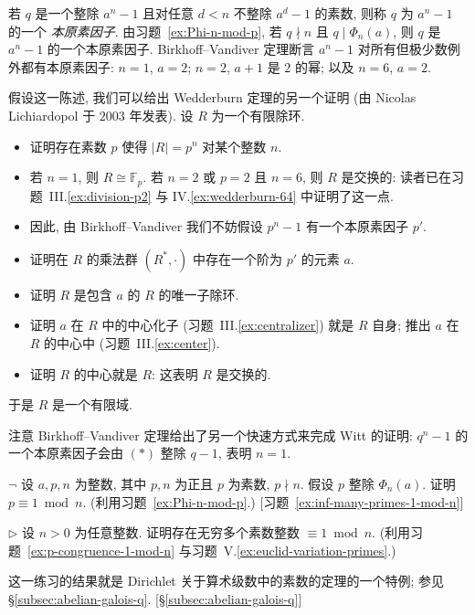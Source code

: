 \begin{prob}\label{ex:primitive-prime-divisor}
若 $q$ 是一个整除 $a^n-1$ 且对任意 $d<n$ 不整除 $a^d-1$ 的素数, 则称 $q$ 为 $a^n-1$ 的一个 \emph{本原素因子}. 由习题~\ref{ex:Phi-n-mod-p}, 若 $q\nmid n$ 且 $q\mid\Phi_n(a)$, 则 $q$ 是 $a^n-1$ 的一个本原素因子. Birkhoff--Vandiver 定理断言 $a^n-1$ 对所有但极少数例外都有本原素因子: $n=1$, $a=2$; $n=2$, $a+1$ 是 $2$ 的幂; 以及 $n=6$, $a=2$.

假设这一陈述, 我们可以给出 Wedderburn 定理的另一个证明 (由 Nicolas Lichiardopol 于 $2003$ 年发表). 设 $R$ 为一个有限除环.
\begin{itemize}
\item 证明存在素数 $p$ 使得 $|R|=p^n$ 对某个整数 $n$.
\item 若 $n=1$, 则 $R\cong\mathbb{F}_p$. 若 $n=2$ 或 $p=2$ 且 $n=6$, 则 $R$ 是交换的: 读者已在习题~III.\ref{ex:division-p2} 与 IV.\ref{ex:wedderburn-64} 中证明了这一点.
\item 因此, 由 Birkhoff--Vandiver 我们不妨假设 $p^n-1$ 有一个本原素因子 $p'$.
\item 证明在 $R$ 的乘法群 $(R^*,\cdot)$ 中存在一个阶为 $p'$ 的元素 $a$.
\item 证明 $R$ 是包含 $a$ 的 $R$ 的唯一子除环.
\item 证明 $a$ 在 $R$ 中的中心化子 (习题~III.\ref{ex:centralizer}) 就是 $R$ 自身; 推出 $a$ 在 $R$ 的中心中 (习题~III.\ref{ex:center}).
\item 证明 $R$ 的中心就是 $R$: 这表明 $R$ 是交换的.
\end{itemize}
于是 $R$ 是一个有限域.

注意 Birkhoff--Vandiver 定理给出了另一个快速方式来完成 Witt 的证明: $q^n-1$ 的一个本原素因子会由 $(*)$ 整除 $q-1$, 表明 $n=1$.
\end{prob}

\begin{prob}\label{ex:p-congruence-1-mod-n}
$\neg$ 设 $a,p,n$ 为整数, 其中 $p,n$ 为正且 $p$ 为素数, $p\nmid n$. 假设 $p$ 整除 $\Phi_n(a)$. 证明 $p\equiv 1\bmod n$. (利用习题~\ref{ex:Phi-n-mod-p}.) [习题~\ref{ex:inf-many-primes-1-mod-n}]
\end{prob}

\begin{prob}\label{ex:inf-many-primes-1-mod-n}
$\triangleright$ 设 $n>0$ 为任意整数. 证明存在无穷多个素数整数 $\equiv 1\bmod n$. (利用习题~\ref{ex:p-congruence-1-mod-n} 与习题~V.\ref{ex:euclid-variation-primes}.)

这一练习的结果就是 Dirichlet 关于算术级数中的素数的定理的一个特例; 参见 §\ref{subsec:abelian-galois-q}. [\S\ref{subsec:abelian-galois-q}]
\end{prob}

